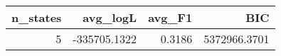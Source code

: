 \begin{tabular}{rrrr}
\toprule
n_states & avg_logL & avg_F1 & BIC \\
\midrule
5 & -335705.1322 & 0.3186 & 5372966.3701 \\
\bottomrule
\end{tabular}
